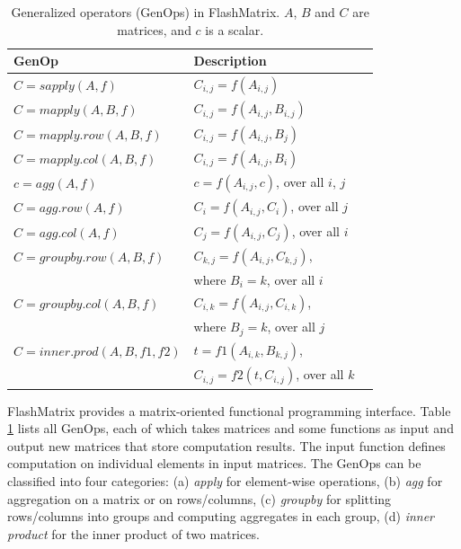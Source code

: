 \begin{table}
\begin{center}
\footnotesize
\begin{tabular}{|l|l|l|}
\hline
GenOp & Description \\
\hline
$C=sapply(A, f)$ & $C_{i,j}=f(A_{i,j})$ \\
\hline
$C=mapply(A, B, f)$ & $C_{i,j}=f(A_{i,j}, B_{i,j})$ \\
\hline
$C=mapply.row(A, B, f)$ & $C_{i,j}=f(A_{i,j}, B_j)$ \\
\hline
$C=mapply.col(A, B, f)$ & $C_{i,j}=f(A_{i,j}, B_i)$ \\
\hline
$c=agg(A, f)$ & $c=f(A_{i,j}, c)$, over all $i$, $j$ \\
\hline
$C=agg.row(A, f)$ & $C_i=f(A_{i,j}, C_i)$, over all $j$ \\
\hline
$C=agg.col(A, f)$ & $C_j=f(A_{i,j}, C_j)$, over all $i$ \\
\hline
$C=groupby.row(A, B, f)$ & $C_{k,j}=f(A_{i,j}, C_{k,j})$,\\ & where $B_i=k$, over all $i$ \\
\hline
$C=groupby.col(A, B, f)$ & $C_{i,k}=f(A_{i,j}, C_{i,k})$,\\ & where $B_j=k$, over all $j$ \\
\hline
$C=inner.prod(A, B, f1, f2)$ & $t=f1(A_{i,k}, B_{k,j})$,
\\ & $C_{i,j}=f2(t, C_{i,j})$, over all $k$ \\
\hline
\end{tabular}
\normalsize
\end{center}
\caption{Generalized operators (GenOps) in FlashMatrix.
$A$, $B$ and $C$ are matrices, and $c$ is a scalar.}
\label{tbl:genops}
\end{table}

FlashMatrix provides a matrix-oriented functional programming interface.
Table \ref{tbl:genops} lists all GenOps, each of which takes matrices and
some functions as input and output new matrices that store computation results.
The input function defines computation on individual elements in input matrices.
The GenOps can be classified into four categories: (a) \textit{apply} for
element-wise operations, (b) \textit{agg} for aggregation on a matrix
or on rows/columns, (c) \textit{groupby} for splitting rows/columns
into groups and computing aggregates in each group,
(d) \textit{inner product} for the inner product of two matrices.


